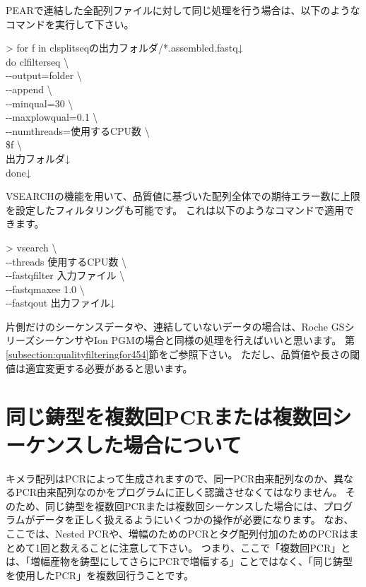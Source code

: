 \documentclass[titlepage,10pt,a4paper]{jsbook}
\newenvironment{cmd}{\begin{oframed}\raggedright\ttfamily\footnotesize\setlength{\baselineskip}{1.4em}}{\end{oframed}\vspace{-1em}}
\begin{document}
PEARで連結した全配列ファイルに対して同じ処理を行う場合は、以下のようなコマンドを実行して下さい。

\begin{cmd}
{\textgreater} for f in clsplitseqの出力フォルダ/*.assembled.fastq↓\\
do clfilterseq {\textbackslash}\\
{-}{-}output=folder {\textbackslash}\\
{-}{-}append {\textbackslash}\\
{-}{-}minqual=30 {\textbackslash}\\
{-}{-}maxplowqual=0.1 {\textbackslash}\\
{-}{-}numthreads=使用するCPU数 {\textbackslash}\\
\$f {\textbackslash}\\
出力フォルダ↓\\
done↓
\end{cmd}

VSEARCHの機能を用いて、品質値に基づいた配列全体での期待エラー数に上限を設定したフィルタリングも可能です。
これは以下のようなコマンドで適用できます。

\begin{cmd}
{\textgreater} vsearch {\textbackslash}\\
{-}{-}threads 使用するCPU数 {\textbackslash}\\
{-}{-}fastq{\textunderscore}filter 入力ファイル {\textbackslash}\\
{-}{-}fastq{\textunderscore}maxee 1.0 {\textbackslash}\\
{-}{-}fastqout 出力ファイル↓
\end{cmd}

片側だけのシーケンスデータや、連結していないデータの場合は、Roche GSシリーズシーケンサやIon PGMの場合と同様の処理を行えばいいと思います。
第\ref{subsection:qualityfilteringfor454}節をご参照下さい。
ただし、品質値や長さの閾値は適宜変更する必要があると思います。

\section{同じ鋳型を複数回PCRまたは複数回シーケンスした場合について}

キメラ配列はPCRによって生成されますので、同一PCR由来配列なのか、異なるPCR由来配列なのかをプログラムに正しく認識させなくてはなりません。
そのため、同じ鋳型を複数回PCRまたは複数回シーケンスした場合には、プログラムがデータを正しく扱えるようにいくつかの操作が必要になります。
なお、ここでは、Nested PCRや、増幅のためのPCRとタグ配列付加のためのPCRはまとめて1回と数えることに注意して下さい。
つまり、ここで「複数回PCR」とは、「増幅産物を鋳型にしてさらにPCRで増幅する」ことではなく、「同じ鋳型を使用したPCR」を複数回行うことです。
\end{document}
